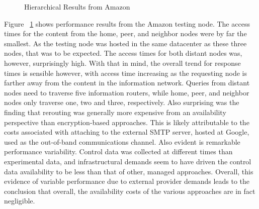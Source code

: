 
\begin{figure}[htbp]
\begin{minipage}[b]{0.5\linewidth}
\centering
{}
\end{minipage}
\begin{minipage}[b]{0.5\linewidth}
\centering
{}
\end{minipage}
\caption{Hierarchical Results from Amazon}
\label{fig:model:amazon-results}
\end{figure}

Figure ~\ref{fig:model:amazon-results} shows performance results from the Amazon testing node.  The access times for the content from the home, peer, and neighbor nodes were by far the smallest.  As the testing node was hosted in the same datacenter as these three nodes, that was to be expected.  The access times for both distant nodes was, however, surprisingly high.  With that in mind, the overall trend for response times is sensible however, with access time increasing as the requesting node is farther away from the content in the information network.  Queries from distant nodes need to traverse five information routers, while home, peer, and neighbor nodes only traverse one, two and three, respectively.  Also surprising was the finding that rerouting was generally more expensive from an availability perspective than encryption-based approaches.  This is likely attributable to the costs associated with attaching to the external SMTP server, hosted at Google, used as the out-of-band communications channel.  Also evident is remarkable performance variability.  Control data was collected at different times than experimental data, and infrastructural demands seem to have driven the control data availability to be less than that of other, managed approaches.  Overall, this evidence of variable performance due to external provider demands leads to the conclusion that overall, the availability costs of the various approaches are in fact negligible.


